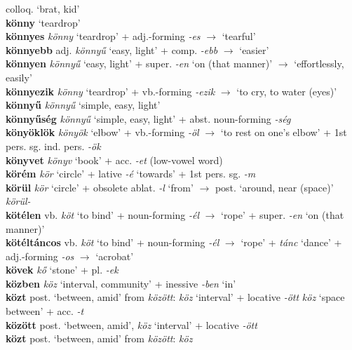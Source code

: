 \documentclass[11pt]{article}
\begin{document}
colloq. `brat, kid' \\
\textbf{könny} `teardrop' \\
\textbf{könnyes} \emph{könny} `teardrop' +
adj.\hyp{}forming \emph{-es} $\rightarrow$ `tearful' \\
\textbf{könnyebb} adj. \emph{könnyű} `easy, light' + comp. \emph{-ebb}
$\rightarrow$ `easier' \\
\textbf{könnyen} \emph{könnyű} `easy, light' + super. \emph{-en} `on
(that manner)'
$\rightarrow$ `effortlessly, easily' \\
\textbf{könnyezik} \emph{könny} `teardrop' +
vb.\hyp{}forming \emph{-ezik} $\rightarrow$ `to cry, to water (eyes)' \\
\textbf{könnyű} \emph{könnyű} `simple, easy, light' \\
\textbf{könnyűség} \emph{könnyű} `simple, easy, light' +
  abst. noun\hyp{}forming \emph{-ség} \\
\textbf{könyöklök} \emph{könyök} `elbow' + vb.-forming \emph{-öl}
$\rightarrow$ `to rest on one's elbow' + 1st
pers. sg. ind. pers. \emph{-ök} \\
\textbf{könyvet} \emph{könyv} `book' + acc. \emph{-et}
(low\hyp{}vowel word) \\
\textbf{körém} \emph{kör} `circle' + lative \emph{-é} `towards' + 1st pers. sg. \emph{-m} \\
\textbf{körül} \emph{kör} `circle' + obsolete ablat. \emph{-l} `from'
$\rightarrow$ post. `around, near (space)' \textbar\textbar{} \emph{körül-} \\
\textbf{kötélen} vb. \emph{köt} `to bind' +
noun\hyp{}forming \emph{-él} $\rightarrow$ `rope' + super. \emph{-en}
`on (that manner)' \\
\textbf{kötéltáncos} vb. \emph{köt} `to bind' +
noun\hyp{}forming \emph{-él} $\rightarrow$ `rope' + \emph{tánc}
`dance' + adj.\hyp{}forming \emph{-os} $\rightarrow$ `acrobat' \\
\textbf{kövek} \emph{kő} `stone' + pl. \emph{-ek} \\
\textbf{közben} \emph{köz} `interval, community' + inessive \emph{-ben}
`in' \\
\textbf{közt} post. `between, amid' from \emph{között}: \emph{köz}
  `interval' + locative \emph{-ött} \textbar\textbar{} \emph{köz}
  `space between' + acc. \emph{-t} \\
\textbf{között} post. `between, amid', \emph{köz} `interval' +
locative \emph{-ött} \\
\textbf{közt} post. `between, amid' from \emph{között}: \emph{köz}
\end{document}
